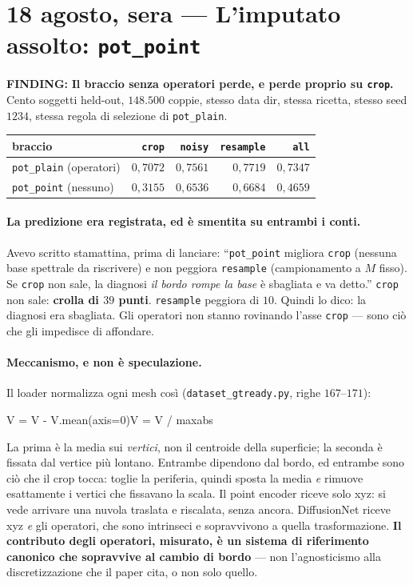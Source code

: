 \documentclass[11pt,a4paper]{article}
\newcommand{\finding}[1]{\textcolor{finding}{\textbf{FINDING:}} #1}
\begin{document}
\section{18 agosto, sera --- L'imputato assolto: \texttt{pot\_point}}

\finding{\textbf{Il braccio senza operatori perde, e perde proprio su \texttt{crop}.} Cento
soggetti held-out, $148{.}500$ coppie, stesso data dir, stessa ricetta, stesso seed $1234$,
stessa regola di selezione di \texttt{pot\_plain}.}

\begin{center}\small
\begin{tabular}{lrrrr}
\toprule
braccio & \texttt{crop} & \texttt{noisy} & \texttt{resample} & \texttt{all} \\
\midrule
\texttt{pot\_plain} (operatori)   & $0{,}7072$ & $0{,}7561$ & $0{,}7719$ & $0{,}7347$ \\
\texttt{pot\_point} (nessuno)     & $0{,}3155$ & $0{,}6536$ & $0{,}6684$ & $0{,}4659$ \\
\bottomrule
\end{tabular}
\end{center}

\paragraph{La predizione era registrata, ed \`e smentita su entrambi i conti.} Avevo scritto
stamattina, prima di lanciare: ``\texttt{pot\_point} migliora \texttt{crop} (nessuna base
spettrale da riscrivere) e non peggiora \texttt{resample} (campionamento a $M$ fisso). Se
\texttt{crop} non sale, la diagnosi \emph{il bordo rompe la base} \`e sbagliata e va detto.''
\texttt{crop} non sale: \textbf{crolla di $39$ punti}. \texttt{resample} peggiora di $10$.
Quindi lo dico: la diagnosi era sbagliata. Gli operatori non stanno rovinando l'asse
\texttt{crop} --- sono ci\`o che gli impedisce di affondare.

\paragraph{Meccanismo, e non \`e speculazione.} Il loader normalizza ogni mesh cos\`i
(\texttt{dataset\_gtready.py}, righe $167$--$171$):
\begin{center}\ttfamily\small
V = V - V.mean(axis=0)\qquad V = V / maxabs
\end{center}
La prima \`e la media sui \emph{vertici}, non il centroide della superficie; la seconda \`e
fissata dal vertice pi\`u lontano. Entrambe dipendono dal bordo, ed entrambe sono ci\`o che il
crop tocca: toglie la periferia, quindi sposta la media \emph{e} rimuove esattamente i vertici
che fissavano la scala. Il point encoder riceve solo xyz: si vede arrivare una nuvola traslata e
riscalata, senza ancora. DiffusionNet riceve xyz \emph{e} gli operatori, che sono intrinseci e
sopravvivono a quella trasformazione. \textbf{Il contributo degli operatori, misurato, \`e un
sistema di riferimento canonico che sopravvive al cambio di bordo} --- non l'agnosticismo alla
discretizzazione che il paper cita, o non solo quello.
\end{document}
